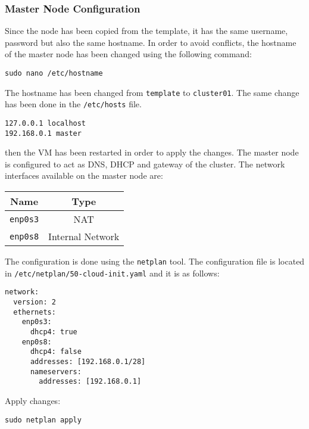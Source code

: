 \subsubsection{Master Node Configuration}

Since the node has been copied from the template, it has the same username, password but also the same hostname. In order to avoid conflicts, the hostname of the master node has been changed using the following command:

\begin{verbatim}
sudo nano /etc/hostname
\end{verbatim}

The hostname has been changed from \texttt{template} to \texttt{cluster01}. The same change has been done in the \texttt{/etc/hosts} file. 

\begin{verbatim}
127.0.0.1 localhost
192.168.0.1 master
\end{verbatim}

then the VM has been restarted in order to apply the changes.
The master node is configured to act as DNS, DHCP and gateway of the cluster. The network interfaces available on the master node are:

\begin{table}[H]
    \centering
    \begin{tabular}{|c|c|}
        \hline
        \textbf{Name} & \textbf{Type} \\
        \hline
        \texttt{enp0s3} & NAT \\
        \texttt{enp0s8} & Internal Network \\
        \hline
    \end{tabular}
\end{table}


The configuration is done using the \texttt{netplan} tool. The configuration file is located in \texttt{/etc/netplan/50-cloud-init.yaml} and it is as follows:

\begin{verbatim}
network:
  version: 2
  ethernets:
    enp0s3:
      dhcp4: true
    enp0s8:
      dhcp4: false
      addresses: [192.168.0.1/28]
      nameservers:
        addresses: [192.168.0.1]
\end{verbatim}

Apply changes:

\begin{verbatim}
sudo netplan apply
\end{verbatim}

